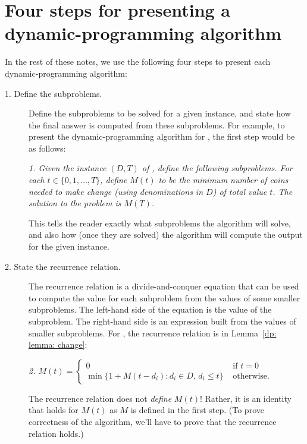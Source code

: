 
\section{Four steps for presenting a dynamic-programming algorithm}\label{dp: sec: four steps}

In the rest of these notes,
we use the following four steps to present each dynamic-programming algorithm:

\begin{description}
\item[1. Define the subproblems.]
  Define the subproblems to be solved for a given instance,
  and state how the final answer is computed from these subproblems.
  For example, to present the dynamic-programming algorithm for ,
  the first step would be as follows:

  \medskip 

  \emph{1.   Given the instance $(D, T)$ of ,
    define the following subproblems.
    For each $t\in \{0,1,\ldots,T\}$,
    define $M(t)$ to be the minimum number of coins needed to make change
    (using denominations in $D$) of total value $t$.
    The solution to the problem is $M(T)$.}

  \medskip 

  This tells the reader exactly what subproblems the algorithm will solve,
  and also how (once they are solved) the algorithm will compute the output for the given instance.

\item[2. State the recurrence relation.]  The recurrence relation is a divide-and-conquer equation
  that can be used to compute the value for each subproblem
  from the values of some smaller subproblems.
  The left-hand side of the equation is the value of the subproblem.
  The right-hand side is an expression
  built from the values of smaller subproblems.
  For , the recurrence relation is in Lemma~\ref{dp: lemma: change}:

 \medskip 
  
    \emph{2. 
      \(
      M(t) = \begin{cases}
        0 & \text{ if } t=0 \\
        \min\{ 1 + M(t-d_i) : d_i \in D,\, d_i \le t\} & \text{ otherwise}.
      \end{cases}
      \)}

  \medskip 

  The recurrence relation does not \emph{define} $M(t)$!
  Rather, it is an identity that holds for $M(t)$ as $M$ is defined in the first step.
  (To prove correctness of the algorithm, we'll have to prove that the recurrence relation holds.)
  

\end{description}
